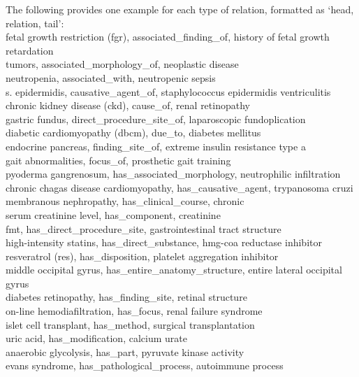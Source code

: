 \documentclass[10pt]{article}
\begin{document}
\begin{appendices}
\begin{tcolorbox}
The following provides one example for each type of relation, formatted as `head, relation, tail':\\
fetal growth restriction (fgr), associated\_finding\_of, history of fetal growth retardation\\
tumors, associated\_morphology\_of, neoplastic disease\\
neutropenia, associated\_with, neutropenic sepsis\\
s. epidermidis, causative\_agent\_of, staphylococcus epidermidis ventriculitis\\
chronic kidney disease (ckd), cause\_of, renal retinopathy\\
gastric fundus,	direct\_procedure\_site\_of, laparoscopic fundoplication\\
diabetic cardiomyopathy (dbcm), due\_to, diabetes mellitus\\
endocrine pancreas, finding\_site\_of, extreme insulin resistance type a\\
gait abnormalities, focus\_of, prosthetic gait training\\
pyoderma gangrenosum, has\_associated\_morphology, neutrophilic infiltration\\
chronic chagas disease cardiomyopathy, has\_causative\_agent, trypanosoma cruzi\\
membranous nephropathy, has\_clinical\_course, chronic\\
serum creatinine level, has\_component, creatinine\\
fmt, has\_direct\_procedure\_site, gastrointestinal tract structure\\
high-intensity statins, has\_direct\_substance, hmg-coa reductase inhibitor\\
resveratrol (res), has\_disposition, platelet aggregation inhibitor\\
middle occipital gyrus, has\_entire\_anatomy\_structure, entire lateral occipital gyrus\\
diabetes retinopathy, has\_finding\_site, retinal structure\\
on-line hemodiafiltration, has\_focus, renal failure syndrome\\
islet cell transplant, has\_method, surgical transplantation\\
uric acid, has\_modification, calcium urate\\
anaerobic glycolysis, has\_part, pyruvate kinase activity\\
evans syndrome, has\_pathological\_process, autoimmune process\\

\end{tcolorbox}
\end{appendices}
\end{document}
